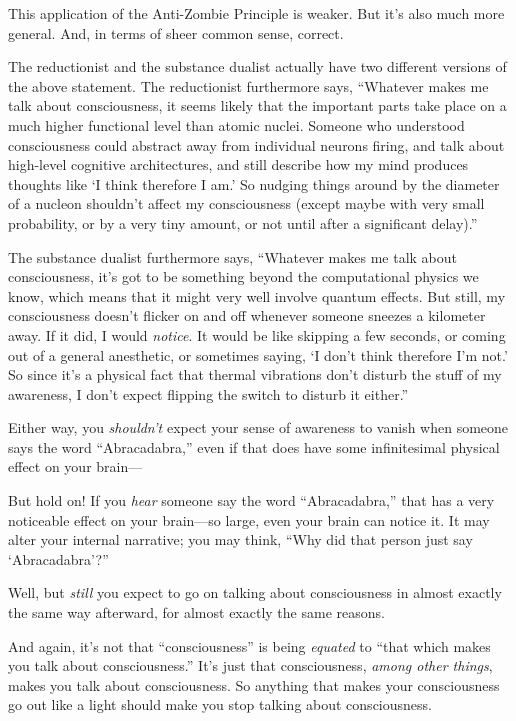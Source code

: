 {
 This application of the Anti-Zombie Principle is weaker. But
it's also much more general. And, in terms of sheer
common sense, correct.}

{
 The reductionist and the substance dualist actually have two
different versions of the above statement. The reductionist furthermore
says, ``Whatever makes me talk about consciousness, it
seems likely that the important parts take place on a much higher
functional level than atomic nuclei. Someone who understood
consciousness could abstract away from individual neurons firing, and
talk about high-level cognitive architectures, and still describe how
my mind produces thoughts like `I think therefore I
am.' So nudging things around by the diameter of a
nucleon shouldn't affect my consciousness (except maybe
with very small probability, or by a very tiny amount, or not until
after a significant delay).''}

{
 The substance dualist furthermore says,
``Whatever makes me talk about consciousness,
it's got to be something beyond the computational
physics we know, which means that it might very well involve quantum
effects. But still, my consciousness doesn't flicker on
and off whenever someone sneezes a kilometer away. If it did, I would
\textit{notice}. It would be like skipping a few seconds, or coming out
of a general anesthetic, or sometimes saying, `I
don't think therefore I'm
not.' So since it's a physical fact
that thermal vibrations don't disturb the stuff of my
awareness, I don't expect flipping the switch to
disturb it either.''}

{
 Either way, you \textit{shouldn't} expect your
sense of awareness to vanish when someone says the word
``Abracadabra,'' even if that does
have some infinitesimal physical effect on your brain---}

{
 But hold on! If you \textit{hear} someone say the word
``Abracadabra,'' that has a very
noticeable effect on your brain---so large, even your brain can notice
it. It may alter your internal narrative; you may think,
``Why did that person just say
`Abracadabra'?''}

{
 Well, but \textit{still} you expect to go on talking about
consciousness in almost exactly the same way afterward, for almost
exactly the same reasons.}

{
 And again, it's not that
``consciousness'' is being
\textit{equated} to ``that which makes you talk about
consciousness.'' It's just that
consciousness, \textit{among other things}, makes you talk about
consciousness. So anything that makes your consciousness go out like a
light should make you stop talking about consciousness.}

